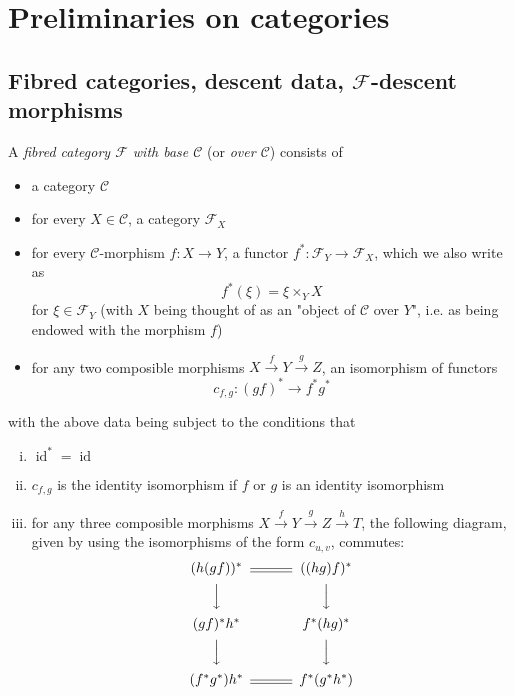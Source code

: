\section{Preliminaries on categories}\label{fga3.i-a}

\subsection{Fibred categories, descent data, $\mathcal{F}$-descent morphisms}\label{fga3.i-a.1}

\label{fga3.i-a.1.a}
\begin{definition}\label{fga3.i-a.1-definition-1.1}
    A \emph{fibred category $\mathcal{F}$ with base $\mathcal{C}$} (or \emph{over $\mathcal{C}$}) consists of
    \begin{itemize}
        \item a category $\mathcal{C}$
        \item for every $X\in\mathcal{C}$, a category $\mathcal{F}_X$
        \item for every $\mathcal{C}$-morphism $f\colon X\to Y$, a functor $f^*\colon\mathcal{F}_Y\to\mathcal{F}_X$, which we also write as
              \[f^*(\xi) = \xi \times_Y X\]
              for $\xi\in\mathcal{F}_Y$ (with $X$ being thought of as an "object of $\mathcal{C}$ over $Y$", i.e. as being endowed with the morphism $f$)
        \item for any two composible morphisms $X\xrightarrow{f}Y\xrightarrow{g}Z$, an isomorphism of functors
              \[c_{f,g}\colon (gf)^* \to f^*g^*\]
    \end{itemize}
    with the above data being subject to the conditions that
    \begin{enumerate}[i.]
        \item $\operatorname{id}^*=\operatorname{id}$
        \item  $c_{f,g}$ is the identity isomorphism if $f$ or $g$ is an identity isomorphism
        \item for any three composible morphisms $X\xrightarrow{f}Y\xrightarrow{g}Z\xrightarrow{h}T$, the following diagram, given by using the isomorphisms of the form $c_{u,v}$, commutes:
              \[
                  \begin{CD}
                      (h(gf))^* @= ((hg)f)^*
                      \\@VVV @VVV
                      \\(gf)^*h^* @. f^*(hg)^*
                      \\@VVV @VVV
                      \\(f^*g^*)h^* @= f^*(g^*h^*)
                  \end{CD}
              \]
    \end{enumerate}
\end{definition}

